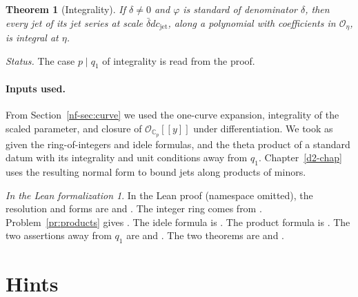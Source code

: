 \documentclass[reqno]{amsart}
\newcounter{chap}
\theoremstyle{plain}
\newtheorem{theorem}{Theorem}[section]
\theoremstyle{definition}
\theoremstyle{remark}
\newtheorem*{leanremark}{In the Lean formalization}
\newcommand{\C}{\mathbb C}
\newcommand{\Oc}{\mathcal O}
\newcommand{\Op}{\mathcal O_{\C_p}}
\newcommand{\cjet}{c_{\mathrm{jet}}}
\begin{document}
\begin{theorem}[Integrality]\label{thm:integral}
If \(\delta \ne 0\) and \(\varphi\) is standard of denominator \(\delta\), then every jet of its jet series at scale \(\bar\delta d \cjet\), along a polynomial with coefficients in \(\Oc_\eta\), is integral at \(\eta\).
\end{theorem}

\emph{Status.} The case \(p\mid q_1\) of integrality is read from the proof.

\paragraph{Inputs used.}
From Section~\ref{nf-sec:curve} we used the one-curve expansion, integrality of the scaled parameter, and closure of \(\Op[[y]]\) under differentiation.  We took as given the ring-of-integers and idele formulas, and the theta product of a standard datum with its integrality and unit conditions away from \(q_1\).  Chapter~\ref{d2-chap} uses the resulting normal form to bound jets along products of minors.

\begin{leanremark}
\begin{sloppypar}
In the Lean proof \cite{GL} (namespace  omitted), the resolution and forms are  and .  The integer ring comes from .  Problem~\ref{pr:products} gives .  The idele formula is .  The product formula is .  The two assertions away from \(q_1\) are  and .  The two theorems are  and .
\end{sloppypar}
\end{leanremark}

\clearpage
\section*{Hints}
\end{document}
